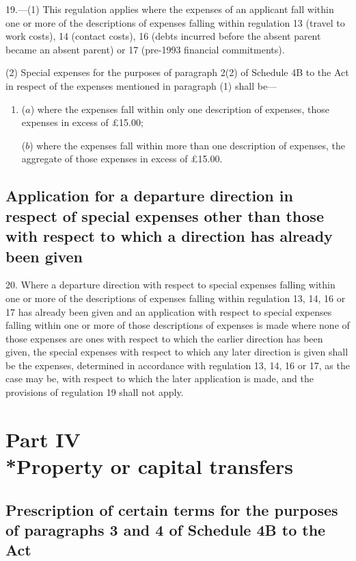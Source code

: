 \documentclass[a4paper]{article}
\begin{document}
19.—(1) This regulation applies where the expenses of an applicant fall within one or more of the descriptions of expenses falling within regulation 13 (travel to work costs), 14 (contact costs), 16 (debts incurred before the absent parent became an absent parent) or 17 (pre-1993 financial commitments).

(2) Special expenses for the purposes of paragraph 2(2) of Schedule 4B to the Act in respect of the expenses mentioned in paragraph (1) shall be—
\begin{enumerate}\item[]
($a$) where the expenses fall within only one description of expenses, those expenses in excess of £15.00;

($b$) where the expenses fall within more than one description of expenses, the aggregate of those expenses in excess of £15.00.
\end{enumerate}

\subsection[20. Application for a departure direction in respect of special expenses other than those with respect to which a direction has already been given]{Application for a departure direction in respect of special expenses other than those with respect to which a direction has already been given}

20.  Where a departure direction with respect to special expenses falling within one or more of the descriptions of expenses falling within regulation 13, 14, 16 or 17 has already been given and an application with respect to special expenses falling within one or more of those descriptions of expenses is made where none of those expenses are ones with respect to which the earlier direction has been given, the special expenses with respect to which any later direction is given shall be the expenses, determined in accordance with regulation 13, 14, 16 or 17, as the case may be, with respect to which the later application is made, and the provisions of regulation 19 shall not apply.

\section[Part IV --- Property or capital transfers]{Part IV\\*Property or capital transfers}

\subsection[21. Prescription of certain terms for the purposes of paragraphs 3 and 4 of Schedule 4B to the Act]{Prescription of certain terms for the purposes of paragraphs 3 and 4 of Schedule 4B to the Act}
\end{document}

